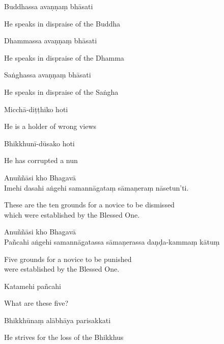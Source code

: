 Buddhassa avaṇṇaṃ bhāsati

\begin{english}
  He speaks in dispraise of the Buddha
\end{english}

Dhammassa avaṇṇaṃ bhāsati

\begin{english}
  He speaks in dispraise of the Dhamma
\end{english}

Saṅghassa avaṇṇaṃ bhāsati

\begin{english}
  He speaks in dispraise of the Saṅgha
\end{english}

Micchā-diṭṭhiko hoti

\begin{english}
  He is a holder of wrong views
\end{english}

Bhikkhunī-dūsako hoti

\begin{english}
  He has corrupted a nun
\end{english}

Anuññāsi kho Bhagavā\\
Imehi dasahi aṅgehi samannāgataṃ sāmaṇeraṃ nāsetun'ti.

\begin{english}
  These are the ten grounds for a novice to be dismissed\\
  which were established by the Blessed One.
\end{english}


Anuññāsi kho Bhagavā\\
Pañcahi aṅgehi samannāgatassa sāmaṇerassa daṇḍa-kammaṃ kātuṃ

\begin{english}
  Five grounds for a novice to be punished\\
  were established by the Blessed One.
\end{english}

Katamehi pañcahi

\begin{english}
  What are these five?
\end{english}

Bhikkhūnaṃ alābhāya parisakkati

\begin{english}
  He strives for the loss of the Bhikkhus
\end{english}

